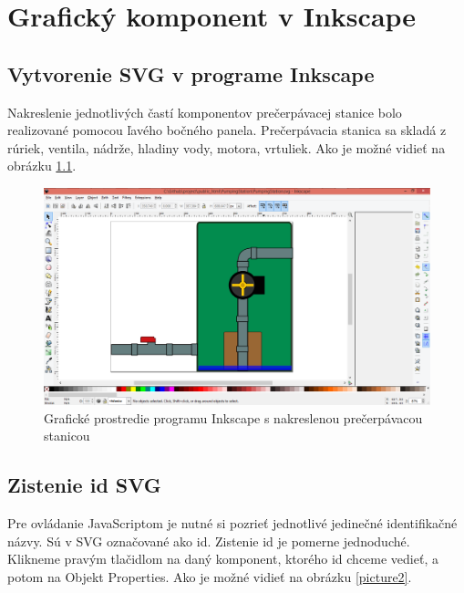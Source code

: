 \chapter{Grafický komponent v Inkscape}

\section{Vytvorenie SVG v programe Inkscape}

Nakreslenie jednotlivých častí komponentov prečerpávacej stanice bolo realizované pomocou ľavého bočného panela. Prečerpávacia stanica sa skladá z rúriek, ventila, nádrže, hladiny vody, motora, vrtuliek. Ako je možné vidieť na obrázku \ref{picture1}.  

\begin{figure}[ht]
	\begin{center}
		\includegraphics [width=15cm] {obrazky/obr1.png}
		\caption{Grafické prostredie programu Inkscape s nakreslenou prečerpávacou stanicou}
		\label{picture1}
	\end{center}
\end{figure}


\section{Zistenie id SVG}

Pre ovládanie JavaScriptom je nutné si pozrieť jednotlivé jedinečné identifikačné názvy. Sú v SVG označované ako id. Zistenie id je pomerne jednoduché. Klikneme pravým tlačidlom na daný komponent, ktorého id chceme vedieť, a potom na Objekt Properties. Ako je možné vidieť na obrázku \ref{picture2}.

